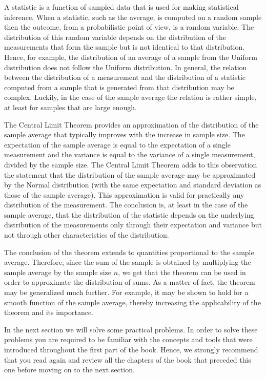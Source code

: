 \documentclass[]{krantz}
\theoremstyle{definition}
\theoremstyle{definition}
\theoremstyle{definition}
\theoremstyle{remark}
\begin{document}
A statistic is a function of sampled data that is used for making
statistical inference. When a statistic, such as the average, is
computed on a random sample then the outcome, from a probabilistic point
of view, is a random variable. The distribution of this random variable
depends on the distribution of the measurements that form the sample but
is not identical to that distribution. Hence, for example, the
distribution of an average of a sample from the Uniform distribution
does not follow the Uniform distribution. In general, the relation
between the distribution of a measurement and the distribution of a
statistic computed from a sample that is generated from that
distribution may be complex. Luckily, in the case of the sample average
the relation is rather simple, at least for samples that are large
enough.

The Central Limit Theorem provides an approximation of the distribution
of the sample average that typically improves with the increase in
sample size. The expectation of the sample average is equal to the
expectation of a single measurement and the variance is equal to the
variance of a single measurement, divided by the sample size. The
Central Limit Theorem adds to this observation the statement that the
distribution of the sample average may be approximated by the Normal
distribution (with the same expectation and standard deviation as those
of the sample average). This approximation is valid for practically any
distribution of the measurement. The conclusion is, at least in the case
of the sample average, that the distribution of the statistic depends on
the underlying distribution of the measurements only through their
expectation and variance but not through other characteristics of the
distribution.

The conclusion of the theorem extends to quantities proportional to the
sample average. Therefore, since the sum of the sample is obtained by
multiplying the sample average by the sample size \(n\), we get that the
theorem can be used in order to approximate the distribution of sums. As
a matter of fact, the theorem may be generalized much further. For
example, it may be shown to hold for a smooth function of the sample
average, thereby increasing the applicability of the theorem and its
importance.

In the next section we will solve some practical problems. In order to
solve these problems you are required to be familiar with the concepts
and tools that were introduced throughout the first part of the book.
Hence, we strongly recommend that you read again and review all the
chapters of the book that preceded this one before moving on to the next
section.
\end{document}
